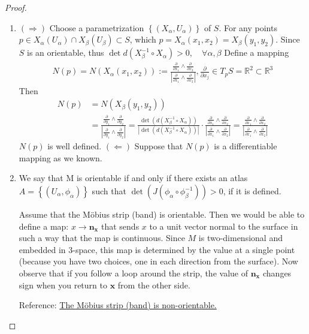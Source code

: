 \begin{proof}
    \begin{enumerate}[label=(\alph*)]
        \item $(\Rightarrow)$ Choose a parametrization $\left\{\left(X_\alpha, U_\alpha\right)\right\}$ of $S$. For any points $p \in X_\alpha\left(U_\alpha\right) \cap X_\beta\left(U_\beta\right) \subset S$, which $p=X_\alpha\left(x_1, x_2\right)=X_\beta\left(y_1, y_2\right)$. Since $S$ is an orientable, thus
$\operatorname{det} d\left(X_\beta^{-1} \circ X_\alpha\right)>0, \quad \forall \alpha, \beta$
Define a mapping
\begin{align*}
N(p)=N\left(X_\alpha\left(x_1, x_2\right)\right):=\frac{\frac{\partial}{\partial x_1} \wedge \frac{\partial}{\partial x_2}}{\left|\frac{\partial}{\partial x_1} \wedge \frac{\partial}{\partial x_2}\right|}, \frac{\partial}{\partial x_j} \in T_p S=\mathbb{R}^2 \subset \mathbb{R}^3
\end{align*}
Then
\begin{align*}
N(p)&=N\left(X_\beta\left(y_1, y_2\right)\right)\\
&=\frac{\frac{\partial}{\partial y_1} \wedge \frac{\partial}{\partial y_2}}{\left|\frac{\partial}{\partial y_1} \wedge \frac{\partial}{\partial y_2}\right|}=\frac{\operatorname{det}\left(d\left(X_\beta^{-1} \circ X_\alpha\right)\right)}{\left|\operatorname{det}\left(d\left(X_\beta^{-1} \circ X_\alpha\right)\right)\right|} \cdot \frac{\frac{\partial}{\partial x_1} \wedge \frac{\partial}{\partial x_2}}{\left|\frac{\partial}{\partial x_1} \wedge \frac{\partial}{\partial x_2}\right|}=\frac{\frac{\partial}{\partial x_1} \wedge \frac{\partial}{\partial x_2}}{\left|\frac{\partial}{\partial x_1} \wedge \frac{\partial}{\partial x_2}\right|}
\end{align*}
$N(p)$ is well defined.
$(\Leftarrow)$ Suppose that $N(p)$ is a differentiable mapping as we known.
        \item We say that $\mathrm{M}$ is orientable if and only if there exists an atlas $A=\left\{\left(U_\alpha, \phi_\alpha\right)\right\}$ such that $\operatorname{det}\left(J\left(\phi_\alpha \circ \phi_\beta^{-1}\right)\right)>0$, if it is defined.

        Assume that the M\"obius strip (band) is orientable. Then we would be able to define a map: $x \rightarrow \boldsymbol{n}_{\boldsymbol{x}}$ that sends $x$ to a unit vector normal to the surface in such a way that the map is continuous. Since $M$ is two-dimensional and embedded in 3-space, this map is determined by the value at a single point (because you have two choices, one in each direction from the surface). Now observe that if you follow a loop around the strip, the value of $\boldsymbol{n}_{\boldsymbol{x}}$ changes sign when you return to $\boldsymbol{x}$ from the other side.

        Reference: \href{https://mathinsight.org/moebius_strip_not_orientable}{The M\"obius strip (band) is non-orientable.}
    \end{enumerate}
    
\end{proof}
